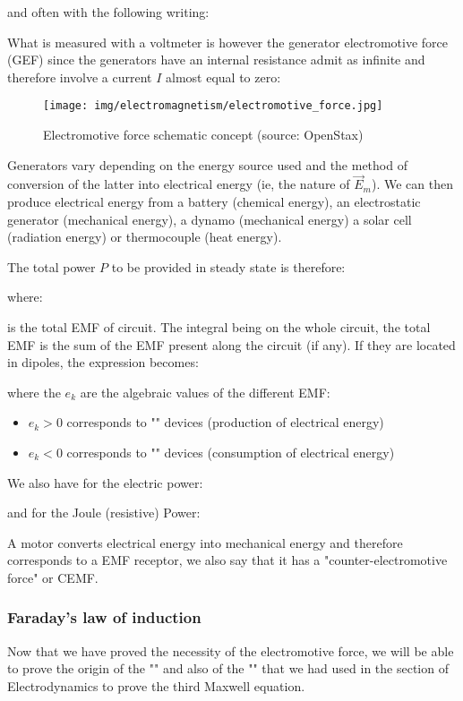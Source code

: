 	and often with the following writing:
	
	What is measured with a voltmeter is however the generator electromotive force (GEF) since the generators have an internal resistance admit as infinite and therefore involve a current $I$ almost equal to zero:
	\begin{figure}[H]
		\centering
		\texttt{[image: img/electromagnetism/electromotive\_force.jpg]}	
		\caption{Electromotive force schematic concept (source: OpenStax)}
	\end{figure}

	Generators vary depending on the energy source used and the method of conversion of the latter into electrical energy (ie, the nature of $\vec{E}_m$). We can then produce electrical energy from a battery (chemical energy), an electrostatic generator (mechanical energy), a dynamo (mechanical energy) a solar cell (radiation energy) or thermocouple (heat energy).
	
	The total power $P$ to be provided in steady state is therefore:
	
	where:
	
	is the total EMF of circuit. The integral being on the whole circuit, the total EMF is the sum of the EMF present along the circuit (if any). If they are located in dipoles, the expression becomes:
	
	where the $e_k$ are the algebraic values of the different EMF:
	\begin{itemize}
		\item $e_k>0$ corresponds to "" devices (production of electrical energy)

		\item $e_k<0$ corresponds to "" devices (consumption of electrical energy)
	\end{itemize}
	We also have for the electric power:
	
	and for the Joule (resistive) Power:
	
	A motor converts electrical energy into mechanical energy and therefore corresponds to a EMF receptor, we also say that it has a "counter-electromotive force" or CEMF.
	
	\subsubsection{Faraday's law of induction}
	Now that we have proved the necessity of the electromotive force, we will be able to prove the origin of the "" and also of the "" that we had used in the section of Electrodynamics to prove the third Maxwell equation. 

